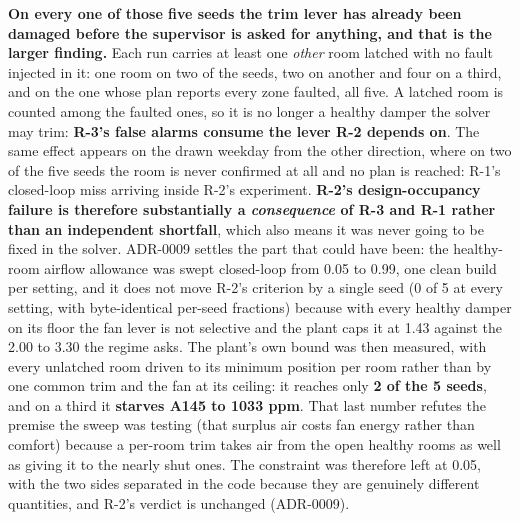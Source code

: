 \textbf{On every one of those five seeds the trim lever has already been damaged before the
supervisor is asked for anything, and that is the larger finding.} Each run carries at least one
\emph{other} room latched with no fault injected in it: one room on two of the seeds, two on
another and four on a third, and on the one whose plan reports every zone faulted, all five.
A latched room is counted among the faulted ones, so it is no longer a healthy damper the solver may
trim: \textbf{R-3's false alarms consume the lever R-2 depends on}. The same effect appears on the
drawn weekday from the other direction, where on two of the five seeds the room is never confirmed
at all and no plan is reached: R-1's closed-loop miss arriving inside R-2's experiment.
\textbf{R-2's design-occupancy failure is therefore substantially a \emph{consequence} of R-3 and
R-1 rather than an independent shortfall}, which also means it was never going to be fixed in the
solver. ADR-0009 settles the part that could have been: the
healthy-room airflow allowance was swept closed-loop from 0.05 to 0.99, one clean build per
setting, and it does not move R-2's criterion by a single seed (0 of 5 at every setting, with
byte-identical per-seed fractions) because with every healthy damper on
its floor the fan lever is not selective and the plant caps it at 1.43 against the 2.00 to 3.30 the
regime asks. The plant's own bound was then measured, with every unlatched room driven to its
minimum position per room rather than by one common trim and the fan at its ceiling: it reaches
only \textbf{2 of the 5 seeds}, and on a third it \textbf{starves A145 to 1033 ppm}. That last
number refutes the premise the sweep was testing (that surplus air costs fan energy rather than
comfort) because a per-room trim takes air from the open healthy rooms as well as giving it to the
nearly shut ones. The constraint was therefore left at 0.05, with the two sides separated in the
code because they are genuinely different quantities, and R-2's verdict is unchanged (ADR-0009).

